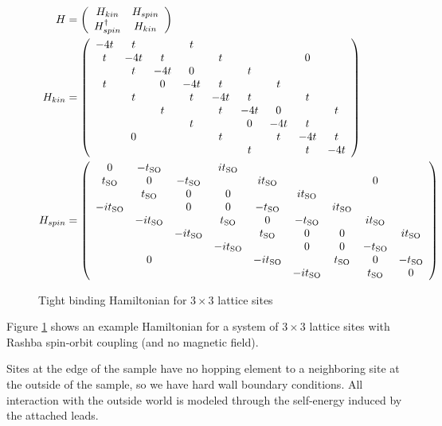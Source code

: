 \documentclass[11pt,twoside]{book}
\newcommand{\inp}[1]{\ensuremath{\left(#1\right)}}
\newcommand{\tso}{\ensuremath{t_{\textnormal{SO}}}}
\begin{document}
\begin{figure}[tb]
    \begin{align*}
        H &= \inp{
           \begin{array}{cc}
                H_{kin}  & H_{spin} \\
                H_{spin}^\dagger & H_{kin} \\
           \end{array}} \\
        H_{kin} &= \inp{
            \begin{array}{ccccccccc}
                -4t & t &  & t\\
                t & -4t & t &  & t &  &  & 0\\
                & t & -4t & 0 &  & t\\
                t &  & 0 & -4t & t &  & t\\
                & t &  & t & -4t & t &  & t\\
                &  & t &  & t & -4t & 0 &  & t\\
                &  &  & t &  & 0 & -4t & t\\
                & 0 &  &  & t &  & t & -4t & t\\
                &  &  &  &  & t &  & t & -4t\end{array}
        } \\
        H_{spin} &= \inp{
            \begin{array}{ccccccccc}
                0 & -\tso &  & i\tso\\
                \tso & 0 & -\tso &  & i\tso &  &  & 0\\
                & \tso & 0 & 0 &  & i\tso\\
                -i\tso &  & 0 & 0 & -\tso &  & i\tso\\
                & -i\tso &  & \tso & 0 & -\tso &  & i\tso\\
                &  & -i\tso &  & \tso & 0 & 0 &  & i\tso\\
                &  &  & -i\tso &  & 0 & 0 & -\tso\\
                & 0 &  &  & -i\tso &  & \tso & 0 & -\tso\\
                &  &  &  &  & -i\tso &  & \tso & 0
            \end{array}
        }
    \end{align*}
    \caption{Tight binding Hamiltonian for $ 3 \times 3 $ lattice sites}
    \label{fig:hamiltonian}
\end{figure}

Figure \ref{fig:hamiltonian} shows an example Hamiltonian for a system of
$3 \times 3$ lattice sites with Rashba spin-orbit coupling (and no magnetic
field).

Sites at the edge of the sample have no hopping element to a neighboring site
at the outside of the sample, so we have hard wall boundary conditions. All
interaction with the outside world is modeled through the self-energy induced
by the attached leads.







\end{document}
